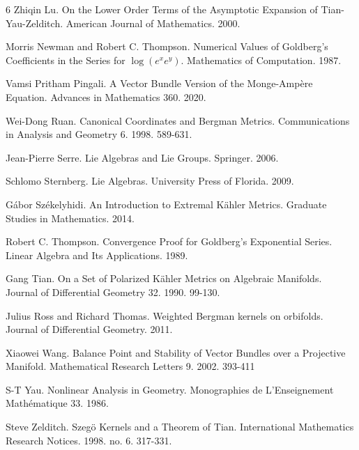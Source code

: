 \documentclass{amsart}
\theoremstyle{definition}
\theoremstyle{remark}
\numberwithin{equation}{section}
\begin{document}
\begin{thebibliography}{6}
Zhiqin Lu.
On the Lower Order Terms of the Asymptotic Expansion of Tian-Yau-Zelditch.
American Journal of Mathematics.
2000.





Morris Newman and Robert C. Thompson.
Numerical Values of Goldberg's Coefficients in the Series for $\log(e^xe^y)$.
Mathematics of Computation.
1987.


Vamsi Pritham Pingali.
A Vector Bundle Version of the Monge-Amp\`ere Equation.
Advances in Mathematics 360. 2020.




Wei-Dong Ruan.
Canonical Coordinates and Bergman Metrics.
Communications in Analysis and Geometry 6. 1998.
589-631.


Jean-Pierre Serre.
Lie Algebras and Lie Groups.
Springer. 2006.

Schlomo Sternberg.
Lie Algebras.
University Press of Florida.
2009.

G\'abor Sz\'ekelyhidi.
An Introduction to Extremal K\"ahler Metrics.
Graduate Studies in Mathematics. 2014.


Robert C. Thompson.
Convergence Proof for Goldberg's Exponential Series.
Linear Algebra and Its Applications. 1989.

Gang Tian.
On a Set of Polarized K\"ahler Metrics on Algebraic Manifolds.
Journal of Differential Geometry 32. 1990.
99-130.


Julius Ross and Richard Thomas.
Weighted Bergman kernels on orbifolds.
Journal of Differential Geometry. 2011.


Xiaowei Wang.
Balance Point and Stability of Vector Bundles over a Projective Manifold.
Mathematical Research Letters 9. 2002. 393-411


S-T Yau.
Nonlinear Analysis in Geometry.
Monographies de L'Enseignement Math\'ematique 33. 1986.


Steve Zelditch.
Szeg\"o Kernels and a Theorem of Tian.
International Mathematics Research Notices. 1998.
no. 6.
317-331.








\end{thebibliography}
\end{document}
